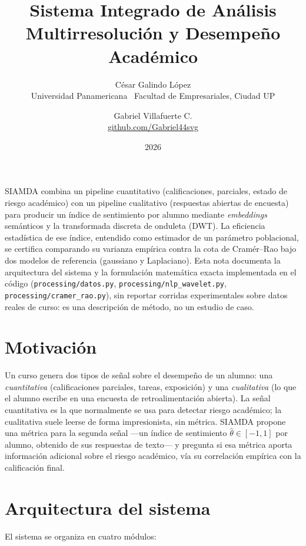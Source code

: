 \documentclass[11pt,a4paper,oneside]{article}
\title{\vspace{-1.5cm}\textbf{\Large Sistema Integrado de Análisis Multirresolución y Desempeño Académico}}
\author{César Galindo López \\ \small Universidad Panamericana \textperiodcentered\ Facultad de Empresariales, Ciudad UP
  \and Gabriel Villafuerte C. \\ \small \href{https://github.com/Gabriel44svg}{github.com/Gabriel44svg}}
\date{\small 2026}
\theoremstyle{definition}
\begin{document}
\maketitle

\begin{ideaBox}
SIAMDA combina un pipeline cuantitativo (calificaciones, parciales, estado de riesgo académico)
con un pipeline cualitativo (respuestas abiertas de encuesta) para producir un índice de
sentimiento por alumno mediante \emph{embeddings} semánticos y la transformada discreta de
onduleta (DWT). La eficiencia estadística de ese índice, entendido como estimador de un
parámetro poblacional, se certifica comparando su varianza empírica contra la cota de
Cramér--Rao bajo dos modelos de referencia (gaussiano y Laplaciano). Esta nota documenta la
arquitectura del sistema y la formulación matemática exacta implementada en el código
(\texttt{processing/datos.py}, \texttt{processing/nlp\_wavelet.py},
\texttt{processing/cramer\_rao.py}), sin reportar corridas experimentales sobre datos reales de
curso: es una descripción de método, no un estudio de caso.
\end{ideaBox}

\section{Motivación}

Un curso genera dos tipos de señal sobre el desempeño de un alumno: una \emph{cuantitativa}
(calificaciones parciales, tareas, exposición) y una \emph{cualitativa} (lo que el alumno
escribe en una encuesta de retroalimentación abierta). La señal cuantitativa es la que
normalmente se usa para detectar riesgo académico; la cualitativa suele leerse de forma
impresionista, sin métrica. SIAMDA propone una métrica para la segunda señal —un índice de
sentimiento $\hat\theta\in[-1,1]$ por alumno, obtenido de sus respuestas de texto— y pregunta
si esa métrica aporta información adicional sobre el riesgo académico, vía su correlación
empírica con la calificación final.

\section{Arquitectura del sistema}

El sistema se organiza en cuatro módulos:
\end{document}

